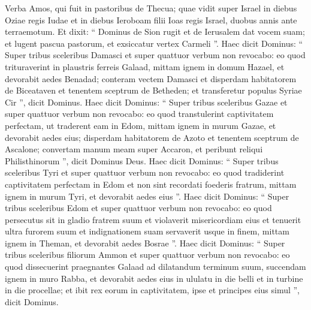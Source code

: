 \begin{biblechapter}
 \verse Verba Amos, qui fuit in pastoribus de Thecua; quae vidit super Israel in diebus Oziae regis Iudae et in diebus Ieroboam filii Ioas regis Israel, duobus annis ante terraemotum.
 \verse Et dixit:
 “ Dominus de Sion rugit
 et de Ierusalem dat vocem suam;
 et lugent pascua pastorum,
 et exsiccatur vertex Carmeli ”.
 \verse Haec dicit Dominus:
 “ Super tribus sceleribus Damasci
 et super quattuor verbum non revocabo:
 eo quod trituraverint in plaustris ferreis Galaad,
 \verse mittam ignem in domum Hazael,
 et devorabit aedes Benadad;
 \verse conteram vectem Damasci
 et disperdam habitatorem de Biceataven
 et tenentem sceptrum de Betheden;
 et transferetur populus Syriae Cir ”,
 dicit Dominus.
 \verse Haec dicit Dominus:
 “ Super tribus sceleribus Gazae
 et super quattuor verbum non revocabo:
 eo quod transtulerint captivitatem perfectam,
 ut traderent eam in Edom,
 \verse mittam ignem in murum Gazae,
 et devorabit aedes eius;
 \verse disperdam habitatorem de Azoto
 et tenentem sceptrum de Ascalone;
 convertam manum meam super Accaron,
 et peribunt reliqui Philisthinorum ”,
 dicit Dominus Deus.
 \verse Haec dicit Dominus:
 “ Super tribus sceleribus Tyri
 et super quattuor verbum non revocabo:
 eo quod tradiderint captivitatem perfectam in Edom
 et non sint recordati foederis fratrum,
 \verse mittam ignem in murum Tyri,
 et devorabit aedes eius ”.
 \verse Haec dicit Dominus:
 “ Super tribus sceleribus Edom
 et super quattuor verbum non revocabo:
 eo quod persecutus sit in gladio fratrem suum
 et violaverit misericordiam eius
 et tenuerit ultra furorem suum
 et indignationem suam servaverit usque in finem,
 \verse mittam ignem in Theman,
 et devorabit aedes Bosrae ”.
 \verse Haec dicit Dominus:
 “ Super tribus sceleribus filiorum Ammon
 et super quattuor verbum non revocabo:
 eo quod dissecuerint praegnantes Galaad
 ad dilatandum terminum suum,
 \verse succendam ignem in muro Rabba,
 et devorabit aedes eius in ululatu in die belli
 et in turbine in die procellae;
 \verse et ibit rex eorum in captivitatem,
 ipse et principes eius simul ”,
 dicit Dominus.
 

\end{biblechapter}
